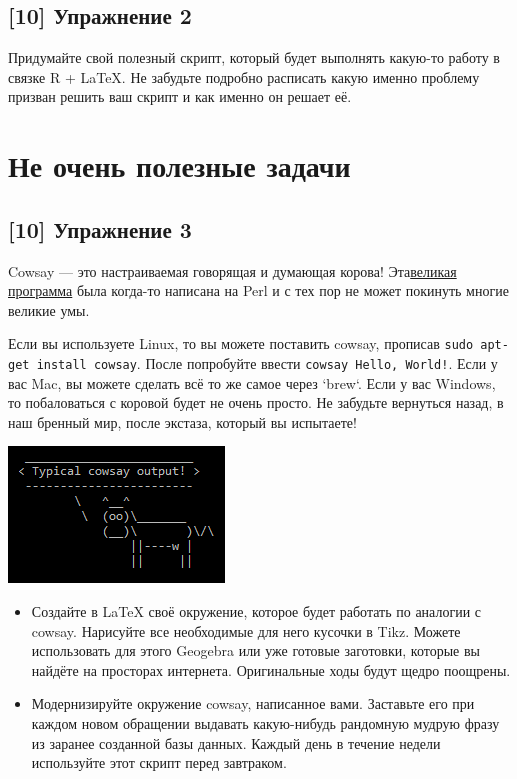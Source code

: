 \documentclass[12pt, a4paper, oneside]{article}
\begin{document}
\subsection*{[10]  Упражнение 2}

Придумайте свой полезный скрипт, который будет выполнять какую-то работу в связке R + \LaTeX{}. Не забудьте подробно расписать какую именно проблему призван решить ваш скрипт и как именно он решает её.

\section*{Не очень полезные задачи}

\subsection*{[10]  Упражнение 3}

Cowsay — это настраиваемая говорящая и думающая корова! Эта\href{http://citkit.ru/articles/679/}{великая программа} была когда-то написана на Perl и с тех пор не может покинуть многие великие умы.

Если вы используете Linux, то вы можете поставить cowsay, прописав \texttt{sudo apt-get install cowsay}. После попробуйте ввести \texttt{cowsay Hello, World!}. Если у вас Mac, вы можете сделать всё то же самое через `brew`. Если у вас Windows, то побаловаться с коровой будет не очень просто. Не забудьте вернуться назад, в наш бренный мир, после экстаза, который вы испытаете!

\begin{center}
	\includegraphics[scale=1]{Cowsay_Typical_Output.png}
\end{center}

\begin{itemize}
	\item Создайте в LaTeX своё окружение, которое будет работать по аналогии с cowsay. Нарисуйте все необходимые для него кусочки в Tikz. Можете использовать для этого Geogebra или уже готовые заготовки, которые вы найдёте на просторах интернета. Оригинальные ходы будут щедро поощрены.
	
	\item Модернизируйте окружение cowsay, написанное вами. Заставьте его при каждом новом обращении выдавать какую-нибудь рандомную мудрую фразу из заранее созданной базы данных. Каждый день в течение недели используйте этот скрипт перед завтраком.
\end{itemize}
\end{document}
